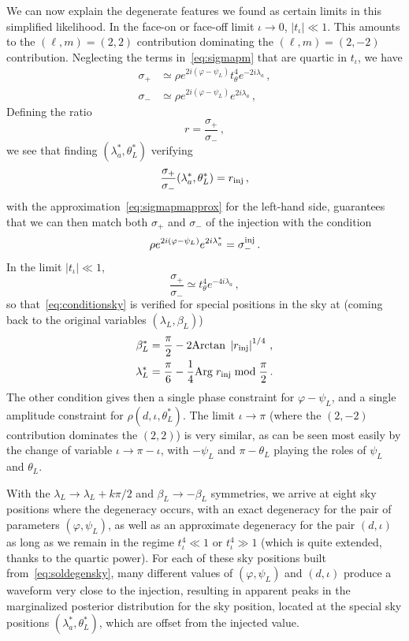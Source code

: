 \documentclass[aps,showpacs,twocolumn,prd,superscriptaddress,nofootinbib]{revtex4-1}
\newcommand{\be}{\begin{equation}}
\newcommand{\ee}{\end{equation}}
\newcommand{\bsub}{\begin{subequations}}
\newcommand{\esub}{\end{subequations}}
\newcommand\betaL{{\beta_{L}}}
\newcommand\lambdaL{{\lambda_{L}}}
\newcommand\psiL{{\psi_{L}}}
\begin{document}
We can now explain the degenerate features we found as certain limits in this simplified likelihood. In the face-on or face-off limit $\iota \rightarrow 0$, $|t_{\iota}| \ll 1$. This amounts to the $(\ell,m)=(2,2)$ contribution dominating the $(\ell, m)=(2,-2)$ contribution. Neglecting the terms in~\eqref{eq:sigmapm} that are quartic in $t_{\iota}$, we have
\bsub\label{eq:sigmapmapprox}
\begin{align}
	\sigma_{+} &\simeq \rho e^{2i(\varphi - \psiL)} t_{\theta}^{4} e^{-2i \lambda_{a}} \,, \\
	\sigma_{-} &\simeq \rho e^{2i(\varphi - \psiL)} e^{2i \lambda_{a}} \,,
\end{align}
\esub
Defining the ratio
\be
	r = \frac{\sigma_{+}}{\sigma_{-}} \,,
\ee
we see that finding $(\lambda_{a}^{*}, \theta_{L}^{*})$ verifying
\be\label{eq:conditionsky}
	\frac{\sigma_{+}}{\sigma_{-}} (\lambda_{a}^{*}, \theta_{L}^{*}) = r_{\rm inj} \,,
\ee
with the approximation~\eqref{eq:sigmapmapprox} for the left-hand side, guarantees that we can then match both $\sigma_{+}$ and $\sigma_{-}$ of the injection with the condition
\be\label{eq:conditionprefactor}
	\rho e^{2i(\varphi - \psiL)} e^{2i \lambda_{a}^{*}} = \sigma_{-}^{\rm inj}\,.
\ee
In the limit $|t_{\iota}| \ll 1$,
\be
	\frac{\sigma_{+}}{\sigma_{-}} \simeq t_{\theta}^{4} e^{-4i\lambda_{a}} \,,
\ee
so that~\eqref{eq:conditionsky} is verified for special positions in the sky at (coming back to the original variables $(\lambdaL, \betaL)$)
\bsub\label{eq:soldegensky}
\begin{align}
	\beta_{L}^{*} &= \frac{\pi}{2} - 2 \mathrm{Arctan} \; \left| r_{\rm inj}\right|^{1/4} \,, \\
	\lambda_{L}^{*} &= \frac{\pi}{6} -\frac{1}{4} \mathrm{Arg} \; r_{\rm inj} \;\mathrm{mod}\; \frac{\pi}{2} \,.
\end{align}
\esub
The other condition gives then a single phase constraint for $\varphi - \psiL$, and a single amplitude constraint for $\rho(d, \iota, \theta_{L}^{*})$. The limit $\iota \rightarrow \pi$ (where the $(2,-2)$ contribution dominates the $(2,2)$) is very similar, as can be seen most easily by the change of variable $\iota \rightarrow \pi - \iota$, with $-\psiL$ and $\pi - \theta_{L}$ playing the roles of $\psiL$ and $\theta_{L}$.

With the $\lambdaL \rightarrow \lambdaL + k \pi/2$ and $\betaL \rightarrow - \betaL$ symmetries, we arrive at eight sky positions where the degeneracy occurs, with an exact degeneracy for the pair of parameters $(\varphi, \psiL)$, as well as an approximate degeneracy for the pair $(d, \iota)$ as long as we remain in the regime $t_{\iota}^{4} \ll 1$ or $t_{\iota}^{4} \gg 1$ (which is quite extended, thanks to the quartic power). For each of these sky positions built from~\eqref{eq:soldegensky}, many different values of $(\varphi, \psiL)$ and $(d, \iota)$ produce a waveform very close to the injection, resulting in apparent peaks in the marginalized posterior distribution for the sky position, located at the special sky positions $(\lambda_{a}^{*}, \theta_{L}^{*})$, which are offset from the injected value.
\end{document}

